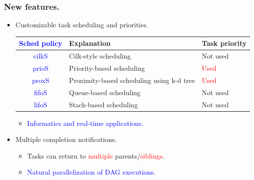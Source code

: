 \documentclass{beamer}
\newcommand{\tablefont}{\fontsize{8}{13}\selectfont}
\begin{document}
\begin{frame}[fragile]
\frametitle{New features.}
\begin{itemize}
\item Customizable task scheduling and priorities.
\begin{center}
\tablefont
\begin{tabular}{|c|l|l|}
\hline
\textcolor{blue}{Sched policy} & Explanation & Task priority \\
\hline
\textcolor{blue}{cilkS} & Cilk-style scheduling & Not used \\
\hline
\textcolor{blue}{prioS} & Priority-based scheduling & \textcolor{red}{Used} \\
\hline
\textcolor{blue}{proxS} & Proximity-based scheduling using k-d tree & \textcolor{red}{Used} \\
\hline
\textcolor{blue}{fifoS} & Queue-based scheduling & Not used \\
\hline
\textcolor{blue}{lifoS} & Stack-based scheduling & Not used \\
\hline
\end{tabular}
\normalsize
\end{center}
  \begin{itemize}
  \item \textcolor{blue}{Informatics and real-time applications.}
  \end{itemize}
\item Multiple completion notifications.
  \begin{itemize}
  \item Tasks can return to \textcolor{red}{multiple} parents/\textcolor{red}{siblings}.
  \item \textcolor{blue}{Natural parallelization of DAG executions}.
  \end{itemize}
\end{itemize}
\end{frame}
\end{document}
